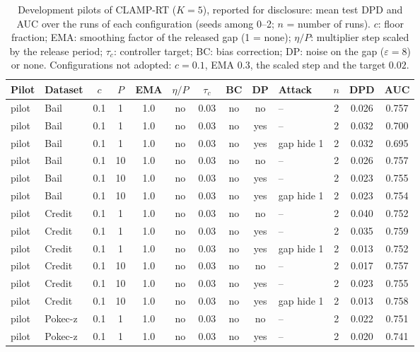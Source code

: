 \begin{table}[tbp]
\centering
\scriptsize
\setlength{\tabcolsep}{3pt}
\caption{Development pilots of CLAMP-RT ($K=5$), reported for disclosure: mean test DPD and AUC over the runs of each configuration (seeds among 0--2; $n$ = number of runs). $c$: floor fraction; EMA: smoothing factor of the released gap (1 = none); $\eta/P$: multiplier step scaled by the release period; $\tau_c$: controller target; BC: bias correction; DP: noise on the gap ($\varepsilon=8$) or none. Configurations not adopted: $c=0.1$, EMA $0.3$, the scaled step and the target $0.02$.}
\label{tab:s_pilot}
\begin{adjustbox}{max width=\textwidth}
\begin{tabular}{llccccccclccc}
\toprule
Pilot & Dataset & $c$ & $P$ & EMA & $\eta/P$ & $\tau_c$ & BC & DP & Attack & $n$ & DPD & AUC \\
\midrule
pilot & Bail & 0.1 & 1 & 1.0 & no & 0.03 & no & no & -- & 2 & 0.026 & 0.757 \\
pilot & Bail & 0.1 & 1 & 1.0 & no & 0.03 & no & yes & -- & 2 & 0.032 & 0.700 \\
pilot & Bail & 0.1 & 1 & 1.0 & no & 0.03 & no & yes & gap hide 1 & 2 & 0.032 & 0.695 \\
pilot & Bail & 0.1 & 10 & 1.0 & no & 0.03 & no & no & -- & 2 & 0.026 & 0.757 \\
pilot & Bail & 0.1 & 10 & 1.0 & no & 0.03 & no & yes & -- & 2 & 0.023 & 0.755 \\
pilot & Bail & 0.1 & 10 & 1.0 & no & 0.03 & no & yes & gap hide 1 & 2 & 0.023 & 0.754 \\
pilot & Credit & 0.1 & 1 & 1.0 & no & 0.03 & no & no & -- & 2 & 0.040 & 0.752 \\
pilot & Credit & 0.1 & 1 & 1.0 & no & 0.03 & no & yes & -- & 2 & 0.035 & 0.759 \\
pilot & Credit & 0.1 & 1 & 1.0 & no & 0.03 & no & yes & gap hide 1 & 2 & 0.013 & 0.752 \\
pilot & Credit & 0.1 & 10 & 1.0 & no & 0.03 & no & no & -- & 2 & 0.017 & 0.757 \\
pilot & Credit & 0.1 & 10 & 1.0 & no & 0.03 & no & yes & -- & 2 & 0.023 & 0.755 \\
pilot & Credit & 0.1 & 10 & 1.0 & no & 0.03 & no & yes & gap hide 1 & 2 & 0.013 & 0.758 \\
pilot & Pokec-z & 0.1 & 1 & 1.0 & no & 0.03 & no & no & -- & 2 & 0.022 & 0.751 \\
pilot & Pokec-z & 0.1 & 1 & 1.0 & no & 0.03 & no & yes & -- & 2 & 0.020 & 0.741 \\

\end{tabular}
\end{adjustbox}
\end{table}
